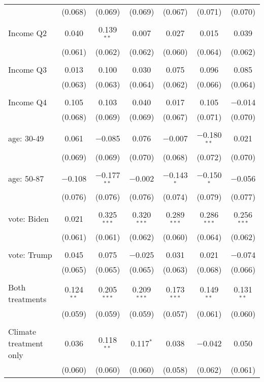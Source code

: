 \begin{tabular}{@{\extracolsep{5pt}}lcccccc}
  & (0.068) & (0.069) & (0.069) & (0.067) & (0.071) & (0.070) \\ 
  & & & & & & \\ 
 Income Q2 & 0.040 & 0.139$^{**}$ & 0.007 & 0.027 & 0.015 & 0.039 \\ 
  & (0.061) & (0.062) & (0.062) & (0.060) & (0.064) & (0.062) \\ 
  & & & & & & \\ 
 Income Q3 & 0.013 & 0.100 & 0.030 & 0.075 & 0.096 & 0.085 \\ 
  & (0.063) & (0.063) & (0.064) & (0.062) & (0.066) & (0.064) \\ 
  & & & & & & \\ 
 Income Q4 & 0.105 & 0.103 & 0.040 & 0.017 & 0.105 & $-$0.014 \\ 
  & (0.068) & (0.069) & (0.069) & (0.067) & (0.071) & (0.070) \\ 
  & & & & & & \\ 
 age: 30-49 & 0.061 & $-$0.085 & 0.076 & $-$0.007 & $-$0.180$^{**}$ & 0.021 \\ 
  & (0.069) & (0.069) & (0.070) & (0.068) & (0.072) & (0.070) \\ 
  & & & & & & \\ 
 age: 50-87 & $-$0.108 & $-$0.177$^{**}$ & $-$0.002 & $-$0.143$^{*}$ & $-$0.150$^{*}$ & $-$0.056 \\ 
  & (0.076) & (0.076) & (0.076) & (0.074) & (0.079) & (0.077) \\ 
  & & & & & & \\ 
 vote: Biden & 0.021 & 0.325$^{***}$ & 0.320$^{***}$ & 0.289$^{***}$ & 0.286$^{***}$ & 0.256$^{***}$ \\ 
  & (0.061) & (0.061) & (0.062) & (0.060) & (0.064) & (0.062) \\ 
  & & & & & & \\ 
 vote: Trump & 0.045 & 0.075 & $-$0.025 & 0.031 & 0.021 & $-$0.074 \\ 
  & (0.065) & (0.065) & (0.065) & (0.063) & (0.068) & (0.066) \\ 
  & & & & & & \\ 
 Both treatments & 0.124$^{**}$ & 0.205$^{***}$ & 0.209$^{***}$ & 0.173$^{***}$ & 0.149$^{**}$ & 0.131$^{**}$ \\ 
  & (0.059) & (0.059) & (0.059) & (0.057) & (0.061) & (0.060) \\ 
  & & & & & & \\ 
 Climate treatment only & 0.036 & 0.118$^{**}$ & 0.117$^{*}$ & 0.038 & $-$0.042 & 0.050 \\ 
  & (0.060) & (0.060) & (0.060) & (0.058) & (0.062) & (0.061) \\ 

\end{tabular}
